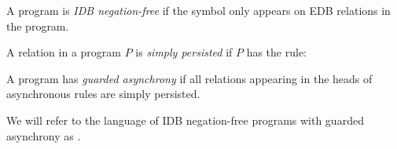 \begin{definition}
A \lang program is {\em IDB negation-free} if the \dedalus{!} symbol only appears on EDB relations in the program.
\end{definition}

\begin{definition}
A relation  in a program $P$ is {\em simply persisted} if $P$ has the rule: 
\end{definition}

\begin{definition}
A \lang program has {\em guarded asynchrony} if all relations appearing in the heads of asynchronous rules are simply persisted.
\end{definition}

We will refer to the language of IDB negation-free \lang programs with guarded asynchrony as \slang.

